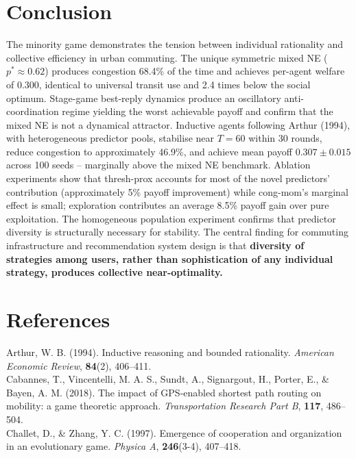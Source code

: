 \section{Conclusion}

The minority game demonstrates the tension between individual rationality and collective efficiency in urban commuting. The unique symmetric mixed NE ($p^* \approx 0.62$) produces congestion 68.4\% of the time and achieves per-agent welfare of $0.300$, identical to universal transit use and 2.4 times below the social optimum. Stage-game best-reply dynamics produce an oscillatory anti-coordination regime yielding the worst achievable payoff and confirm that the mixed NE is not a dynamical attractor. Inductive agents following Arthur (1994), with heterogeneous predictor pools, stabilise near $T=60$ within 30 rounds, reduce congestion to approximately 46.9\%, and achieve mean payoff $0.307 \pm 0.015$ across 100 seeds -- marginally above the mixed NE benchmark. Ablation experiments show that thresh-prox accounts for most of the novel predictors' contribution (approximately 5\% payoff improvement) while cong-mom's marginal effect is small; exploration contributes an average 8.5\% payoff gain over pure exploitation. The homogeneous population experiment confirms that predictor diversity is structurally necessary for stability. The central finding for commuting infrastructure and recommendation system design is that \textbf{diversity of strategies among users, rather than sophistication of any individual strategy, produces collective near-optimality.} \\

\newpage
\section*{References}

Arthur, W. B. (1994). Inductive reasoning and bounded rationality. \textit{American Economic Review}, \textbf{84}(2), 406--411. \\

Cabannes, T., Vincentelli, M. A. S., Sundt, A., Signargout, H., Porter, E., \& Bayen, A. M. (2018). The impact of GPS-enabled shortest path routing on mobility: a game theoretic approach. \textit{Transportation Research Part B}, \textbf{117}, 486--504. \\

Challet, D., \& Zhang, Y. C. (1997). Emergence of cooperation and organization in an evolutionary game. \textit{Physica A}, \textbf{246}(3-4), 407--418. \\

